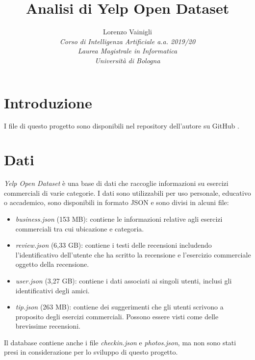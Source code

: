 \documentclass[12pt]{article}
\title{Analisi di Yelp Open Dataset}
\author{
        Lorenzo Vainigli\\
        \textit{\small Corso di Intelligenza Artificiale a.a. 2019/20}\\
        \textit{\small Laurea Magistrale in Informatica}\\
        \textit{\small Università di Bologna}
}
\date{}
\begin{document}
\maketitle
\tableofcontents

\section{Introduzione}
I file di questo progetto sono disponibili nel repository dell'autore su GitHub \cite{repo}. 

\section{Dati}
\textit{Yelp Open Dataset} \cite{yelp} è una base di dati che raccoglie informazioni su esercizi commerciali di varie categorie. I dati sono utilizzabili per uso personale, educativo o accademico, sono disponibili in formato JSON e sono divisi in alcuni file:
\begin{itemize}
\item \textit{business.json} (153 MB): contiene le informazioni relative agli esercizi commerciali tra cui ubicazione e categoria.
\item \textit{review.json} (6,33 GB): contiene i testi delle recensioni includendo l'identificativo dell'utente che ha scritto la recensione e l'esercizio commerciale oggetto della recensione.
\item \textit{user.json} (3,27 GB): contiene i dati associati ai singoli utenti, inclusi gli identificativi degli amici.
\item \textit{tip.json} (263 MB): contiene dei suggerimenti che gli utenti scrivono a proposito degli esercizi commerciali. Possono essere visti come delle brevissime recensioni.
\end{itemize}
Il database contiene anche i file \textit{checkin.json} e \textit{photos.json}, ma non sono stati presi in considerazione per lo sviluppo di questo progetto.
\end{document}
